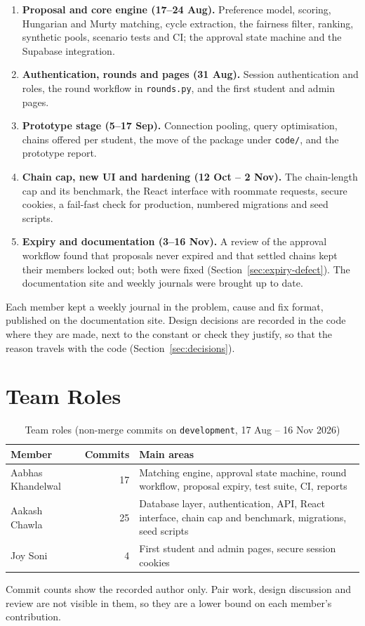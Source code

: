 \begin{enumerate}
  \item \textbf{Proposal and core engine (17--24 Aug).} Preference model,
  scoring, Hungarian and Murty matching, cycle extraction, the fairness
  filter, ranking, synthetic pools, scenario tests and CI; the approval
  state machine and the Supabase integration.
  \item \textbf{Authentication, rounds and pages (31 Aug).} Session
  authentication and roles, the round workflow in \texttt{rounds.py}, and
  the first student and admin pages.
  \item \textbf{Prototype stage (5--17 Sep).} Connection pooling, query
  optimisation, chains offered per student, the move of the package under
  \texttt{code/}, and the prototype report.
  \item \textbf{Chain cap, new UI and hardening (12 Oct -- 2 Nov).} The
  chain-length cap and its benchmark, the React interface with roommate
  requests, secure cookies, a fail-fast check for production, numbered
  migrations and seed scripts.
  \item \textbf{Expiry and documentation (3--16 Nov).} A review of the
  approval workflow found that proposals never expired and that settled
  chains kept their members locked out; both were fixed
  (Section~\ref{sec:expiry-defect}). The documentation site and weekly
  journals were brought up to date.
\end{enumerate}

Each member kept a weekly journal in the problem, cause and fix format,
published on the documentation site. Design decisions are recorded in the
code where they are made, next to the constant or check they justify,
so that the reason travels with the code (Section~\ref{sec:decisions}).

\section{Team Roles}

\begin{table}[H]
\centering
\small
\begin{tabularx}{\textwidth}{>{\raggedright\arraybackslash}p{} r L}
\toprule
\textbf{Member} & \textbf{Commits} & \textbf{Main areas} \\
\midrule
Aabhas Khandelwal & 17 & Matching engine, approval state machine, round workflow, proposal expiry, test suite, CI, reports \\
Aakash Chawla & 25 & Database layer, authentication, API, React interface, chain cap and benchmark, migrations, seed scripts \\
Joy Soni & 4 & First student and admin pages, secure session cookies \\
\bottomrule
\end{tabularx}
\caption{Team roles (non-merge commits on \texttt{development}, 17 Aug -- 16 Nov 2026)}
\label{tab:roles}
\end{table}

Commit counts show the recorded author only. Pair work, design discussion
and review are not visible in them, so they are a lower bound on each
member's contribution.
